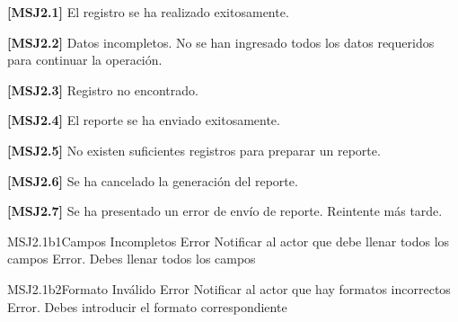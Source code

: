 

	\begin{Citemize}
	\item {\bf [MSJ2.1]} El registro se ha realizado exitosamente.
\end{Citemize}

\begin{Citemize}
	\item {\bf [MSJ2.2]} Datos incompletos. No se han ingresado todos los datos requeridos para continuar la operación.
\end{Citemize}

\begin{Citemize}
	\item {\bf [MSJ2.3]} Registro no encontrado.
\end{Citemize}

\begin{Citemize}
	\item {\bf [MSJ2.4]} El reporte se ha enviado exitosamente.
\end{Citemize}

\begin{Citemize}
	\item {\bf [MSJ2.5]} No existen suficientes registros para preparar un reporte.
\end{Citemize}

\begin{Citemize}
	\item {\bf [MSJ2.6]} Se ha cancelado la generación del reporte.
\end{Citemize}

\begin{Citemize}
	\item {\bf [MSJ2.7]} Se ha presentado un error de envío de reporte. Reintente más tarde.
\end{Citemize}


\begin{Message}{MSJ2.1b1}{Campos Incompletos}
		\MSGitem[Tipo:] Error	
		\MSGitem[Objetivo: ] Notificar al actor que debe llenar todos los campos
		\MSGitem[Redacción: ] Error. Debes llenar todos los campos
	\end{Message}
	
	\begin{Message}{MSJ2.1b2}{Formato Inválido}
		\MSGitem[Tipo:] Error	
		\MSGitem[Objetivo: ] Notificar al actor que hay formatos incorrectos
		\MSGitem[Redacción: ] Error. Debes introducir el formato correspondiente
	\end{Message}
	
